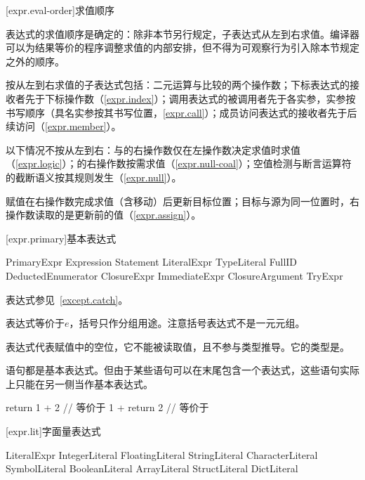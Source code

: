 [expr.eval-order]{求值顺序}

\pnum
表达式的求值顺序是确定的：除非本节另行规定，子表达式从左到右求值。编译器可以为结果等价的程序调整求值的内部安排，但不得为可观察行为引入除本节规定之外的顺序。

\pnum
按从左到右求值的子表达式包括：二元运算与比较的两个操作数；下标表达式的接收者先于下标操作数（\ref{expr.index}）；调用表达式的被调用者先于各实参，实参按书写顺序（具名实参按其书写位置，\ref{expr.call}）；成员访问表达式的接收者先于后续访问（\ref{expr.member}）。

\pnum
以下情况不按从左到右：\tcode{\&\&}与\tcode{||}的右操作数仅在左操作数决定求值时求值（\ref{expr.logic}）；的右操作数按需求值（\ref{expr.null-coal}）；空值检测与断言运算符的截断语义按其规则发生（\ref{expr.null}）。

\pnum
赋值在右操作数完成求值（含移动）后更新目标位置；目标与源为同一位置时，右操作数读取的是更新前的值（\ref{expr.assign}）。

[expr.primary]{基本表达式}

\begin{bnf}{PrimaryExpr}
    \terminal{(} Expression \terminal{)} \br
    \terminal{_} \br
    Statement \br
    LiteralExpr \br
    TypeLiteral \br
    FullID \br
    DeductedEnumerator \br
    \terminal{\textasciicircum} \br
    \terminal{\$} \br
    ClosureExpr \br
    ImmediateExpr \br
    ClosureArgument \br
    TryExpr
\end{bnf}

\pnum
{}表达式参见~\ref{except.catch}。

\pnum
表达式等价于$e$，括号只作分组用途。\enternote 注意括号表达式不是一元元组。\exitnote

\pnum
表达式\tcode{_}代表赋值中的空位，它不能被读取值，且不参与类型推导。它的类型是。

\pnum
语句都是基本表达式。但由于某些语句可以在末尾包含一个表达式，这些语句实际上只能在另一侧当作基本表达式。

\enterexample
\begin{codeblock}

return 1 + 2 // 等价于
1 + return 2 // 等价于

\end{codeblock}
\exitexample

[expr.lit]{字面量表达式}

\begin{bnf}{LiteralExpr}
    IntegerLiteral \br
    FloatingLiteral \br
    StringLiteral \br
    CharacterLiteral \br
    SymbolLiteral \br
    BooleanLiteral \br
     \br
    ArrayLiteral \br
    StructLiteral \br
    DictLiteral
\end{bnf}

